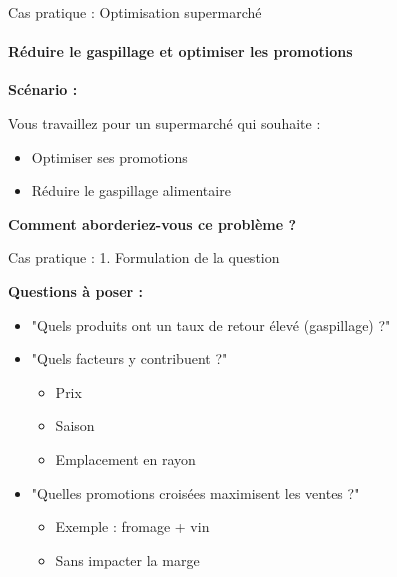\begin{frame}{Cas pratique : Optimisation supermarché}
\framesubtitle{Réduire le gaspillage et optimiser les promotions}

\textbf{Scénario :}

\vspace{0.2cm}

Vous travaillez pour un supermarché qui souhaite :
\begin{itemize}
    \item Optimiser ses promotions
    \item Réduire le gaspillage alimentaire
\end{itemize}

\vspace{0.3cm}

\textbf{Comment aborderiez-vous ce problème ?}

\end{frame}

\begin{frame}{Cas pratique : 1. Formulation de la question}

\textbf{Questions à poser :}

\vspace{0.3cm}

\begin{itemize}
    \item "Quels produits ont un taux de retour élevé (gaspillage) ?"
    \item "Quels facteurs y contribuent ?"
        \begin{itemize}
            \item Prix
            \item Saison
            \item Emplacement en rayon
        \end{itemize}
    \item "Quelles promotions croisées maximisent les ventes ?"
        \begin{itemize}
            \item Exemple : fromage + vin
            \item Sans impacter la marge
        \end{itemize}
\end{itemize}

\end{frame}

